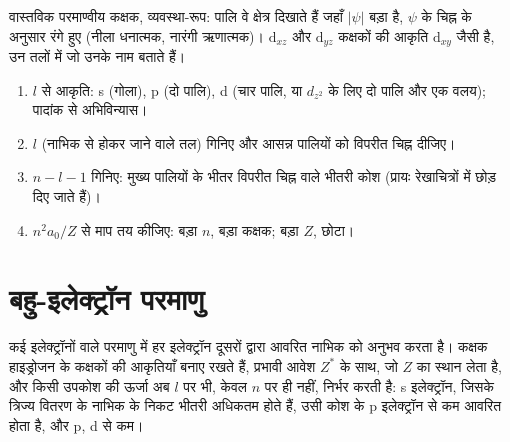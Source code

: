 \begin{omfigure}

{\small वास्तविक परमाण्वीय कक्षक, व्यवस्था-रूप: पालि वे क्षेत्र दिखाते हैं जहाँ $|\psi|$
बड़ा है, $\psi$ के चिह्न के अनुसार रंगे हुए (नीला धनात्मक, नारंगी ऋणात्मक)।
$\mathrm d_{xz}$ और $\mathrm d_{yz}$ कक्षकों की आकृति $\mathrm d_{xy}$ जैसी है, उन
तलों में जो उनके नाम बताते हैं।}
\end{omfigure}

\begin{method}[क्वांटम संख्याओं से कक्षक का रेखाचित्र]\label{met:b2:atomic-orbitals:draw-orbital}
\begin{enumerate}
  \item $l$ से आकृति: s (गोला), p (दो पालि), d (चार पालि, या $d_{z^2}$ के लिए दो
        पालि और एक वलय); पादांक से अभिविन्यास।
  \item $l$  (नाभिक से होकर जाने वाले तल) गिनिए और
        आसन्न पालियों को विपरीत चिह्न दीजिए।
  \item $n - l - 1$  गिनिए: मुख्य पालियों के भीतर विपरीत चिह्न वाले भीतरी कोश
        (प्रायः रेखाचित्रों में छोड़ दिए जाते हैं)।
  \item $n^2a_0/Z$ से माप तय कीजिए: बड़ा $n$, बड़ा कक्षक; बड़ा $Z$, छोटा।
\end{enumerate}
\end{method}

\section{बहु-इलेक्ट्रॉन परमाणु}

कई इलेक्ट्रॉनों वाले परमाणु में हर इलेक्ट्रॉन दूसरों द्वारा आवरित नाभिक को
अनुभव करता है। कक्षक हाइड्रोजन के कक्षकों की आकृतियाँ बनाए रखते हैं, प्रभावी आवेश $Z^*$ के साथ,
जो $Z$ का स्थान लेता है, और किसी उपकोश की ऊर्जा अब $l$ पर भी, केवल $n$ पर ही नहीं,
निर्भर करती है: s इलेक्ट्रॉन, जिसके त्रिज्य वितरण के नाभिक के निकट भीतरी अधिकतम
होते हैं, उसी कोश के p इलेक्ट्रॉन से कम आवरित होता है, और p, d से
कम।

